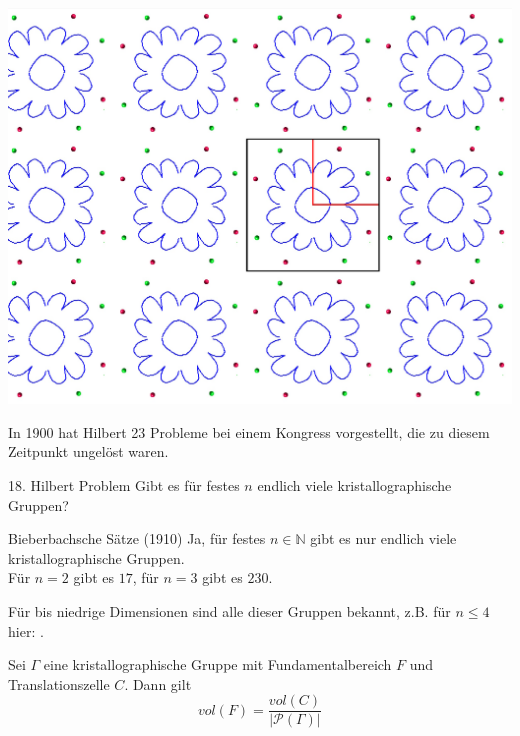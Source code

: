 \documentclass{beamer}
\theoremstyle{plain}
\newcommand\N{\mathbb N}
\renewcommand{\P}{\mathcal{P}}
\begin{document}
\begin{frame}
    \centering
    \includegraphics[width=\textwidth]{images/p4-animation/p4-full-trans.jpg}
\end{frame}

\begin{frame}
    In 1900 hat Hilbert 23 Probleme bei einem Kongress vorgestellt, die zu diesem Zeitpunkt ungelöst waren.
    \begin{block}{18. Hilbert Problem}
        Gibt es für festes $n$ endlich viele kristallographische Gruppen?
    \end{block}
    \pause
    \begin{exampleblock}{Bieberbachsche Sätze (1910)}
        Ja, für festes $n \in \N$ gibt es nur endlich viele kristallographische Gruppen. \\
        Für $n=2$ gibt es $17$, für $n=3$ gibt es $230$.
    \end{exampleblock}
    Für bis niedrige Dimensionen sind alle dieser Gruppen bekannt, z.B. für $n\leq 4$ hier: \cite{crystGrpsDimFour}.
\end{frame}



\begin{frame}
    \begin{theorem}
        Sei $\Gamma$ eine kristallographische Gruppe mit Fundamentalbereich $F$ und Translationszelle $C$. Dann gilt
        $$
            vol(F) = \frac{vol(C)}{|\P(\Gamma)|}
        $$
    \end{theorem}
\end{frame}
\end{document}

